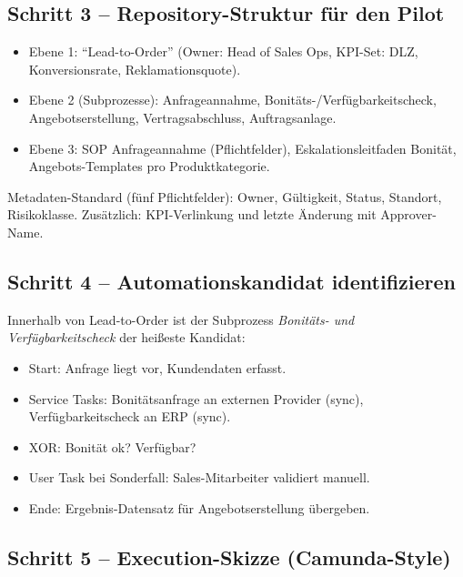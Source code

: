 \documentclass[11pt,a4paper,oneside]{article}
\begin{document}
\subsection{Schritt 3 -- Repository-Struktur für den Pilot}

\begin{itemize}
  \item Ebene 1: ``Lead-to-Order'' (Owner: Head of Sales Ops, KPI-Set: DLZ, Konversionsrate, Reklamationsquote).
  \item Ebene 2 (Subprozesse): Anfrageannahme, Bonitäts-/Verfügbarkeitscheck, Angebotserstellung, Vertragsabschluss, Auftragsanlage.
  \item Ebene 3: SOP Anfrageannahme (Pflichtfelder), Eskalationsleitfaden Bonität, Angebots-Templates pro Produktkategorie.
\end{itemize}

Metadaten-Standard (fünf Pflichtfelder): Owner, Gültigkeit, Status, Standort, Risikoklasse. Zusätzlich: KPI-Verlinkung und letzte Änderung mit Approver-Name.

\subsection{Schritt 4 -- Automationskandidat identifizieren}

Innerhalb von Lead-to-Order ist der Subprozess \emph{Bonitäts- und Verfügbarkeitscheck} der heißeste Kandidat:

\begin{itemize}
  \item Start: Anfrage liegt vor, Kundendaten erfasst.
  \item Service Tasks: Bonitätsanfrage an externen Provider (sync), Verfügbarkeitscheck an ERP (sync).
  \item XOR: Bonität ok? Verfügbar?
  \item User Task bei Sonderfall: Sales-Mitarbeiter validiert manuell.
  \item Ende: Ergebnis-Datensatz für Angebotserstellung übergeben.
\end{itemize}

\subsection{Schritt 5 -- Execution-Skizze (Camunda-Style)}
\end{document}
